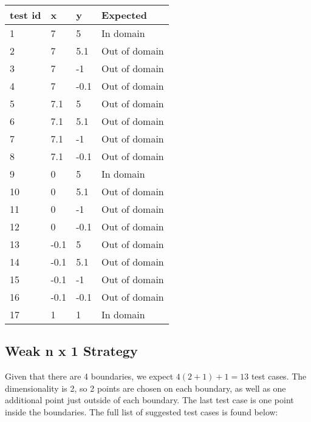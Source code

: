 \documentclass[letterpaper]{article}
\begin{document}
\begin{adjustbox}{center}
	\begin{tabular}{llll}
		test id & x    & y    & Expected      \\ \hline
		1       & 7    & 5    & In domain     \\
		2       & 7    & 5.1  & Out of domain \\
		3       & 7    & -1   & Out of domain \\
		4       & 7    & -0.1 & Out of domain \\
		5       & 7.1  & 5    & Out of domain \\
		6       & 7.1  & 5.1  & Out of domain \\
		7       & 7.1  & -1   & Out of domain \\
		8       & 7.1  & -0.1 & Out of domain \\
		9       & 0    & 5    & In domain     \\
		10      & 0    & 5.1  & Out of domain \\
		11      & 0    & -1   & Out of domain \\
		12      & 0    & -0.1 & Out of domain \\
		13      & -0.1 & 5    & Out of domain \\
		14      & -0.1 & 5.1  & Out of domain \\
		15      & -0.1 & -1   & Out of domain \\
		16      & -0.1 & -0.1 & Out of domain \\
		17      & 1    & 1    & In domain     \\
	\end{tabular}
\end{adjustbox}

\subsection{Weak n x 1 Strategy}
Given that there are 4 boundaries, we expect $4(2+1) +1 = 13$ test cases.
The dimensionality is 2, so 2 points are chosen on each boundary, as well
as one additional point just outside of each boundary. The last test case
is one point inside the boundaries. The full list of suggested test cases
is found below:
\vspace{20pt}
\end{document}
